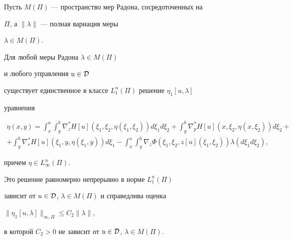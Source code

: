 Пусть $M(\Pi)$ --- пространство мер Радона, сосредоточенных на


$\Pi$, а $\|\lambda\|$ --- полная вариация меры


$\lambda\in M(\Pi)$. 








\begin{lems}


\label{adj2}


Для любой меры Радона $\lambda\in M(\Pi)$


и любого управления $u\in {\cal D}$


существует единственное в классе $L_1^n(\Pi)$ решение $\eta_1[u,\lambda]$


уравнения


\begin{multline}\label{adj22}


\eta(x,y)=\int_x^a\int_y^b\nabla_z^*H[u](\xi_1,\xi_2,\eta(\xi_1,\xi_2))


d\xi_1 d\xi_2+


\int_y^b\nabla_p^*H[u](x,\xi_2,\eta(x,\xi_2)) d\xi_2+ \\


%


+\int_y^b\nabla_r^*H[u](\xi_1,y,\eta(\xi_1,y)) d\xi_1-


\int_x^a\int_y^b\nabla_z\Phi(\xi_1,\xi_2, z[u](\xi_1,\xi_2)) 


\lambda(d\xi_1 d\xi_2),


\end{multline}


причем $\eta\in L_\infty^n(\Pi)$. 


Это решение равномерно непрерывно в норме $L_1^n(\Pi)$


зависит от $u\in {\cal D}$, $\lambda\in M(\Pi)$ и справедлива оценка


$\|\eta_1[u, \lambda]\|_{\infty, \Pi}\leq C_2\|\lambda\|$,


в которой $C_2>0$ не зависит от $u\in{\cal D}$, $\lambda\in M(\Pi)$.


\end{lems}








